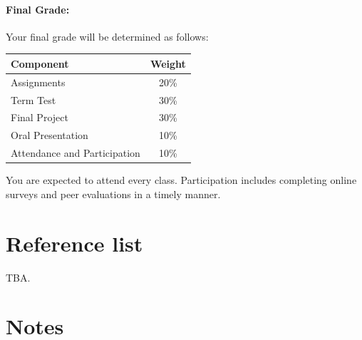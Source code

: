 \documentclass[12pt]{article}
\begin{document}
\paragraph*{Final Grade:}
Your final grade will be determined as follows:
%
\begin{center}
\begin{tabular}{l|c}
\bf Component & \bf Weight \\\hline
Assignments & 20\% \\
Term Test & 30\% \\
Final Project & 30\% \\
Oral Presentation & 10\% \\
Attendance and Participation & 10\% \\
\end{tabular}
\end{center}
\noindent You are expected to attend every class.  Participation
includes completing online surveys and peer evaluations in a timely
manner.

\section*{Reference list}

TBA. 

\section*{Notes}
\end{document}
